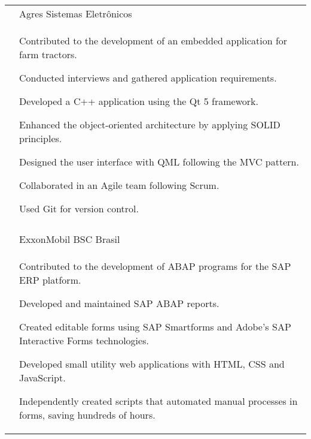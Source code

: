 \documentclass[a4paper,12pt]{article}
\begin{document}
\begin{longtable}{r|p{14.3cm}}
 & Agres Sistemas Eletrônicos \\*
 &\small{
    \begin{itemize*}[label=\Large\textbullet]
        \item Contributed to the development of an embedded application for farm tractors.
        \item \mbox{Conducted} interviews and gathered application requirements.
        \item Developed a \mbox{C++} \mbox{application} using the Qt 5 framework.
        \item Enhanced the object-oriented architecture by \mbox{applying} SOLID principles.
        \item Designed the user interface with QML following the MVC pattern.
        \item Collaborated in an Agile team following Scrum.
        \item Used Git for version control.
    \end{itemize*}
}
 \\ \\

& ExxonMobil BSC Brasil\\*
&\small{
    \begin{itemize*}[label=\Large\textbullet]
        \item Contributed to the development of ABAP programs for the SAP ERP platform.
        \item Developed and maintained SAP ABAP reports.
        \item Created editable forms using SAP Smartforms and Adobe's SAP Interactive Forms technologies.
        \item Developed small utility web applications with HTML, CSS and JavaScript.
        \item Independently created scripts that automated manual processes in forms, saving hundreds of hours.
    \end{itemize*}
}
\end{longtable}
\end{document}
